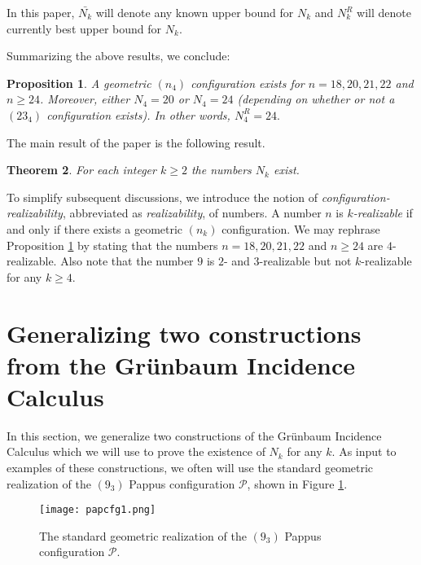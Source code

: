 \documentclass[reqno,12pt]{amsart}
\theoremstyle{plain}
\newtheorem{theorem}{Theorem}%
\newtheorem{prop}[theorem]{Proposition}
\theoremstyle{definition}
\theoremstyle{remark}
\newcommand{\mc}[1]{\mathcal{#1}}
\begin{document}
In this paper, $\bar{N_k}$ will denote any known upper bound for $N_k$ and $N^R_k$ will denote currently best upper bound for $N_k$.

Summarizing the above results, we conclude:
\begin{prop}\label{prop:N-4-results}
A geometric $(n_4)$ configuration exists for $n = 18,20,21,22$ and  $n \geq 24$. Moreover, either $N_{4} = 20$ or $N_{4} = 24$ 
(depending on whether or not a $(23_{4})$ configuration exists). In other words, $N^R_4 = 24.$
 \end{prop}

The main result of the paper is the following result.

\begin{theorem}\label{mainTheorem}
For each integer $k \geq 2$ the numbers $N_k$ exist. 
\end{theorem}

To simplify subsequent discussions, we introduce the notion of \emph{configuration-realizability}, 
abbreviated as \emph{realizability}, of numbers. A number $n$ is \emph{$k$-realizable} if and only if there 
exists a geometric $(n_k)$ configuration. We may rephrase Proposition \ref{prop:N-4-results} 
by stating that the numbers $n = 18, 20, 21, 22$ and $n \geq 24$ are $4$-realizable.  Also note that the 
number $9$ is $2$- and $3$-realizable but not $k$-realizable for any $k \geq 4$.


\section{Generalizing two constructions from the Gr\"{u}nbaum Incidence Calculus} \label{sect:Grunbaum}



In this section, we generalize two constructions of the Gr\"unbaum Incidence Calculus which we will use to prove the existence 
of $N_{k}$ for any $k$. As input to examples of these constructions, we often will use the standard geometric realization of 
the $(9_{3})$ Pappus configuration $\mc{P}$, shown in Figure \ref{fig:pappus}. 

\begin{figure}[htbp]
\begin{center}
\texttt{[image: papcfg1.png]}
\caption{The standard geometric realization of the $(9_{3})$ Pappus configuration $\mc{P}$.}
\label{fig:pappus}
\end{center}
\end{figure}
\end{document}
